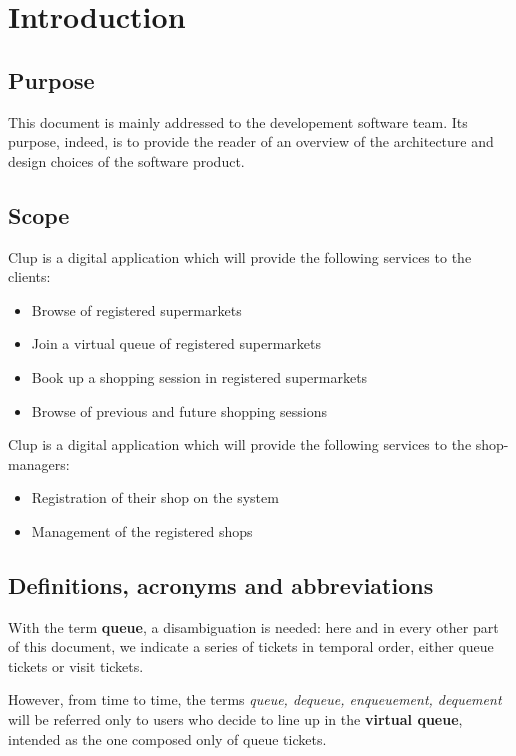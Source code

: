 \section{Introduction}
\label{sect:introduction}

\subsection{Purpose}
\label{subsect:purpose}
This document is mainly addressed to the developement software team. 
Its purpose, indeed, is to provide the reader of an overview of the architecture and design choices of the software product.

\subsection{Scope}
\label{subsect:scope}

Clup is a digital application which will provide the following services to the clients:
\begin{itemize}
    \item Browse of registered supermarkets
    \item Join a virtual queue of registered supermarkets 
    \item Book up a shopping session in registered supermarkets 
    \item Browse of previous and future shopping sessions 
\end{itemize}
Clup is a digital application which will provide the following services to the shop-managers:
\begin{itemize}
    \item Registration of their shop on the system
    \item Management of the registered shops
\end{itemize}


\subsection{Definitions, acronyms and abbreviations}
\label{subsect:definitionsacronymsabbreviations}

With the term \textbf{queue}, a disambiguation is needed: here and in every other part of this document, we indicate a series of tickets in temporal order, either queue tickets or visit tickets. 

However, from time to time, the terms \textit{queue, dequeue, enqueuement, dequement} will be referred only to users who decide to line up in the \textbf{virtual queue}, intended as the one composed only of queue tickets. 

